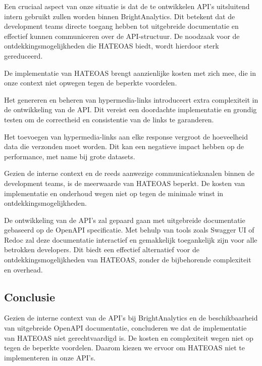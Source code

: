 Een cruciaal aspect van onze situatie is dat de te ontwikkelen API's uitsluitend intern gebruikt zullen worden binnen BrightAnalytics. Dit betekent dat de development teams directe toegang hebben tot uitgebreide documentatie en effectief kunnen communiceren over de API-structuur. De noodzaak voor de ontdekkingsmogelijkheden die HATEOAS biedt, wordt hierdoor sterk gereduceerd.

\bigskip

De implementatie van HATEOAS brengt aanzienlijke kosten met zich mee, die in onze context niet opwegen tegen de beperkte voordelen.

\bigskip

Het genereren en beheren van hypermedia-links introduceert extra complexiteit in de ontwikkeling van de API. Dit vereist een doordachte implementatie en grondig testen om de correctheid en consistentie van de links te garanderen.

\bigskip

Het toevoegen van hypermedia-links aan elke response vergroot de hoeveelheid data die verzonden moet worden. Dit kan een negatieve impact hebben op de performance, met name bij grote datasets.

\bigskip

Gezien de interne context en de reeds aanwezige communicatiekanalen binnen de development teams, is de meerwaarde van HATEOAS beperkt. De kosten van implementatie en onderhoud wegen niet op tegen de minimale winst in ontdekkingsmogelijkheden.

\bigskip

De ontwikkeling van de API's zal gepaard gaan met uitgebreide documentatie gebaseerd op de OpenAPI specificatie. Met behulp van tools zoals Swagger UI of Redoc zal deze documentatie interactief en gemakkelijk toegankelijk zijn voor alle betrokken developers. Dit biedt een effectief alternatief voor de ontdekkingsmogelijkheden van HATEOAS, zonder de bijbehorende complexiteit en overhead.

\subsection{Conclusie}

Gezien de interne context van de API's bij BrightAnalytics en de beschikbaarheid van uitgebreide OpenAPI documentatie, concluderen we dat de implementatie van HATEOAS niet gerechtvaardigd is. De kosten en complexiteit wegen niet op tegen de beperkte voordelen. Daarom kiezen we ervoor om HATEOAS niet te implementeren in onze API's.

